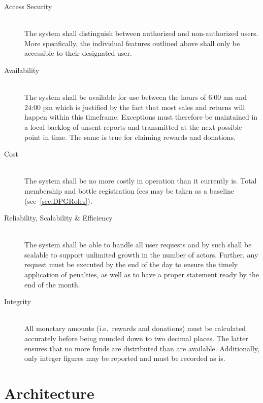 \begin{description}
	\item[Access Security]
	\hfill \\
	The system shall distinguish between authorized and non-authorized users. More specifically, the individual features outlined above shall only be accessible to their designated user.
	\item[Availability]
	\hfill \\
	The system shall be available for use between the hours of 6:00 am and 24:00 pm  which is justified by the fact that most sales and returns will happen within this timeframe. Exceptions must therefore be maintained in a local backlog of unsent reports and transmitted at the next possible point in time. The same is true for claiming rewards and donations.
	\item[Cost]
	\hfill \\
	The system shall be no more costly in operation than it currently is. Total membership and bottle registration fees may be taken as a baseline (see~\ref{sec:DPGRoles}).
	\item[Reliability, Scalability \& Efficiency]
	\hfill \\
	The system shall be able to handle all user requests and by such shall be scalable to support unlimited growth in the number of actors. Further, any request must be executed by the end of the day  to ensure the timely application of penalties, as well as to have a proper statement ready by the end of the month.
	\item[Integrity]
	\hfill \\
	All monetary amounts (i.e.~rewards and donations) must be calculated accurately before being rounded down to two decimal places. The latter ensures that no more funds are distributed than are available. Additionally, only integer figures may be reported and must be recorded as is.
\end{description}
	
\pagebreak

\section{Architecture}
